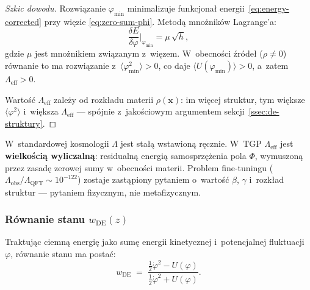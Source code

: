 \begin{proof}[Szkic dowodu]
Rozwi\k{a}zanie $\varphi_{\min}$ minimalizuje funkcjona\l{}
energii~\eqref{eq:energy-corrected} przy wi\k{e}zie
\eqref{eq:zero-sum-phi}. Metod\k{a} mno\.znik\'ow Lagrange'a:
\begin{equation}
    \frac{\delta E}{\delta\varphi}\bigg|_{\varphi_{\min}}
    = \mu\,\sqrt{h},
\end{equation}
gdzie $\mu$ jest mno\.znikiem zwi\k{a}zanym z~wi\k{e}zem.
W~obecno\'sci \'zr\'ode\l{} ($\rho \neq 0$) r\'ownanie to
ma rozwi\k{a}zanie z~$\langle\varphi_{\min}^2\rangle > 0$,
co daje $\langle U(\varphi_{\min})\rangle > 0$, a~zatem
$\Lambda_{\mathrm{eff}} > 0$.

Warto\'s\'c $\Lambda_{\mathrm{eff}}$ zale\.zy od rozk\l{}adu
materii $\rho(\mathbf{x})$: im wi\k{e}cej struktur, tym wi\k{e}ksze
$\langle\varphi^2\rangle$ i~wi\k{e}ksza
$\Lambda_{\mathrm{eff}}$ --- sp\'ojnie
z~jako\'sciowym argumentem sekcji~\ref{ssec:de-struktury}.
\end{proof}

\begin{remark}\label{rem:Lambda-nie-param}
W~standardowej kosmologii $\Lambda$ jest sta\l{}\k{a}
wstawion\k{a} r\k{e}cznie.
W~TGP $\Lambda_{\mathrm{eff}}$ jest \textbf{wielko\'sci\k{a} wyliczaln\k{a}}:
residualn\k{a} energi\k{a} samosprz\k{e}\.zenia pola $\Phi$,
wymuszon\k{a} przez zasad\k{e} zerowej sumy w~obecno\'sci materii.
Problem fine-tuningu ($\Lambda_{\mathrm{obs}}/\Lambda_{\mathrm{QFT}}
\sim 10^{-122}$) zostaje zast\k{a}piony pytaniem o~warto\'s\'c
$\beta$, $\gamma$ i~rozk\l{}ad struktur --- pytaniem
fizycznym, nie metafizycznym.
\end{remark}

\subsubsection{R\'ownanie stanu $w_{\mathrm{DE}}(z)$}

\begin{proposition}\label{prop:wDE}
Traktuj\k{a}c ciemn\k{a} energi\k{e} jako sum\k{e} energii
kinetycznej i~potencjalnej fluktuacji $\varphi$, r\'ownanie stanu
ma posta\'c:
\begin{equation}\label{eq:wDE-def}
  \boxed{
    w_{\mathrm{DE}}
    \;=\; \frac{\frac{1}{2}\dot{\varphi}^2 - U(\varphi)}
               {\frac{1}{2}\dot{\varphi}^2 + U(\varphi)}.
  }
\end{equation}
\end{proposition}

